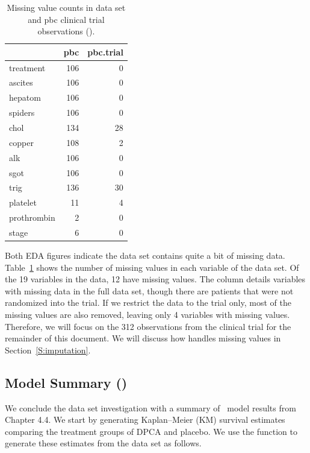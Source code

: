 \documentclass[nojss]{jss}
\begin{document}
\begin{table}

\caption{\label{tab:missing}\label{T:missing}Missing value counts in  data set and pbc clinical trial observations ().}
\centering
\begin{tabular}[t]{lrr}
\toprule
  & pbc & pbc.trial\\
\midrule
treatment & 106 & 0\\
ascites & 106 & 0\\
hepatom & 106 & 0\\
spiders & 106 & 0\\
chol & 134 & 28\\
\addlinespace
copper & 108 & 2\\
alk & 106 & 0\\
sgot & 106 & 0\\
trig & 136 & 30\\
platelet & 11 & 4\\
\addlinespace
prothrombin & 2 & 0\\
stage & 6 & 0\\
\bottomrule
\end{tabular}
\end{table}



Both EDA figures indicate the  data set contains quite a bit of missing data. Table~\ref{T:missing} shows the number of missing values in each variable of the  data set. Of the 19 variables in the data, 12 have missing values. The  column details variables with missing data in the full  data set, though there are  patients that were not randomized into the trial. If we restrict the data to the trial only, most of the missing values are also removed, leaving only 4 variables with missing values. Therefore, we will focus on the 312 observations from the clinical trial for the remainder of this document. We will discuss how  handles missing values in Section~\ref{S:imputation}.

\subsection[PBC Model Summary]{\cite{fleming:1991} Model Summary ()}

We conclude the data set investigation with a summary of~\cite{fleming:1991} model results from Chapter 4.4. We start by generating Kaplan--Meier (KM) survival estimates comparing the treatment groups of DPCA and placebo. We use the   function to generate these estimates from the data set as follows.
\end{document}
